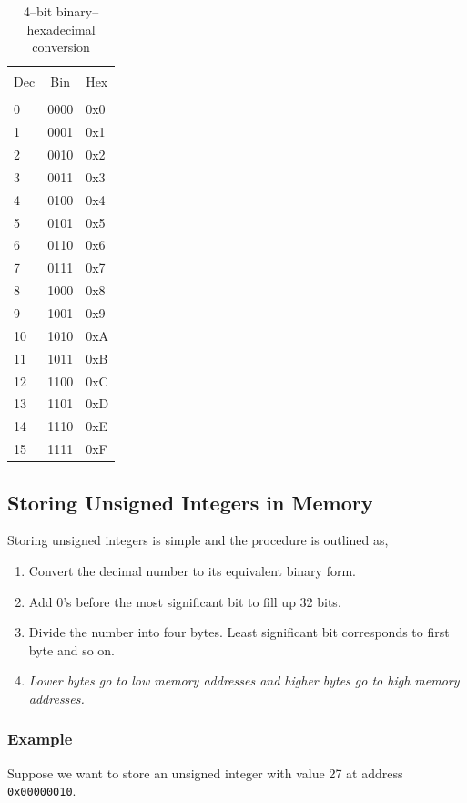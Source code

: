 \documentclass[12pt,a4paper]{article}
\begin{document}
\begin{table}[H]
\centering
\label{4-bit-bin-hex-table}
	\begin{tabular}{l c l}
	\hline \hline \\ [-2ex]
	Dec & Bin & Hex\\
	\hline \\ [-2ex]
	0  & 0000 & 0x0\\
	1  & 0001 & 0x1\\
	2  & 0010 & 0x2\\
	3  & 0011 & 0x3\\
	4  & 0100 & 0x4\\
	5  & 0101 & 0x5\\
	6  & 0110 & 0x6\\
	7  & 0111 & 0x7\\
	8  & 1000 & 0x8\\
	9  & 1001 & 0x9\\
	10 & 1010 & 0xA\\
	11 & 1011 & 0xB\\
	12 & 1100 & 0xC\\
	13 & 1101 & 0xD\\
	14 & 1110 & 0xE\\
	15 & 1111 & 0xF\\
	\hline \hline
	\end{tabular}
\caption{4--bit binary--hexadecimal conversion}
\end{table}

\subsection{Storing Unsigned Integers in Memory}
Storing unsigned integers is simple and the procedure is outlined as,
\begin{enumerate}
\item Convert the decimal number to its equivalent binary form.
\item Add 0's before the most significant bit to fill up 32 bits\footnotemark.
\item Divide the number into four bytes. Least significant bit corresponds to first byte and so on.
\item \emph{Lower bytes go to low memory addresses and higher bytes go to high memory addresses.}
\end{enumerate}

\subsubsection{Example}
Suppose we want to store an unsigned integer with value 27 at address \verb|0x00000010|.
\end{document}
